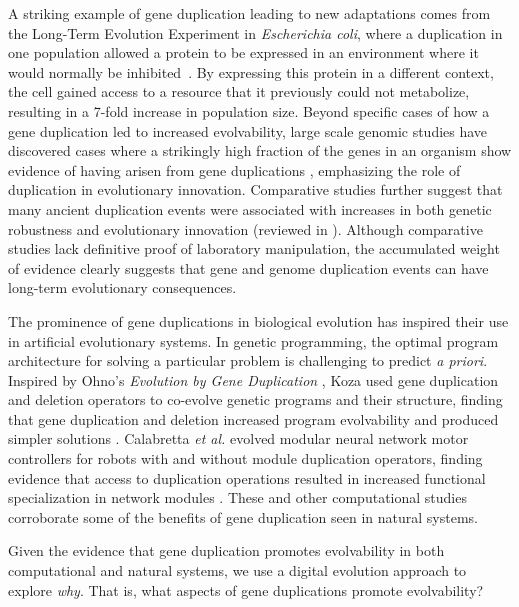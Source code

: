 A striking example of gene duplication leading to new adaptations
comes from the Long-Term Evolution Experiment in \textit{Escherichia coli}, where a duplication in one population allowed a protein to be expressed in an environment where it would normally be inhibited~\citep{blount_genomic_2012}.
By expressing this protein in a different context, the cell gained access to a resource that it previously could not metabolize, resulting in a 7-fold increase in population size. %
Beyond specific cases of how a gene duplication led to increased evolvability, large scale genomic studies have discovered cases where a strikingly high fraction of the genes in an organism show evidence of having arisen from gene duplications \citep{teichmann_structural_1998,Teichmann:2004cz}, emphasizing the role of duplication in evolutionary innovation.
Comparative studies further suggest that many ancient duplication events were associated with increases in both genetic robustness and evolutionary innovation (reviewed in \citep{wagner_gene_2008}).
Although comparative studies lack definitive proof of laboratory manipulation, the accumulated weight of evidence clearly suggests that gene and genome duplication events can have long-term evolutionary consequences.

The prominence of gene duplications in biological evolution has inspired their use in artificial evolutionary systems.
In genetic programming, the optimal program architecture for solving a particular problem is challenging to predict \textit{a priori}.
Inspired by Ohno's \textit{Evolution by Gene Duplication} \citep{ohno1970evolution}, Koza used gene duplication and deletion operators to co-evolve genetic programs and their structure, finding that gene duplication and deletion increased program evolvability and produced simpler solutions \citep{Koza:1995fr}.
Calabretta \textit{et al.} evolved modular neural network motor controllers for robots with and without module duplication operators, finding evidence that access to duplication operations resulted in increased functional specialization in network modules \citep{Calabretta:1998vh,Calabretta:2000tl}.
These and other computational studies \citep{Ryan:1998gm,Sawai:1999genetic,Sawai:2000comparative,Schmitt:2005bc} corroborate some of the benefits of gene duplication seen in natural systems.

Given the evidence that gene duplication promotes evolvability in both computational and natural systems, we use a digital evolution approach to explore \textit{why}.
That is, what aspects of gene duplications promote evolvability?


